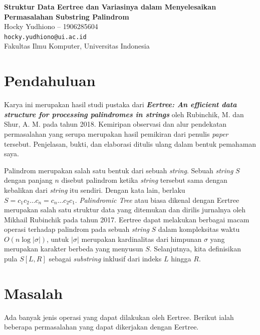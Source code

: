 \documentclass[11pt, a4paper, final]{article}
\begin{document}
\begin{center}
    \Large
    \textbf{Struktur Data Eertree dan Variasinya dalam Menyelesaikan Permasalahan Substring Palindrom\\}
    \vspace{0.2cm}
    \Large
    Hocky Yudhiono – 1906285604\\
    \texttt{hocky.yudhiono@ui.ac.id}\\
    \vspace{0.2cm}
    \large
    Fakultas Ilmu Komputer, Universitas Indonesia\\
\end{center}
\onehalfspacing

\section{Pendahuluan}

Karya ini merupakan hasil studi pustaka dari \textit{\textbf{Eertree: An efficient data structure for processing palindromes in strings}} oleh Rubinchik, M. dan Shur, A. M. pada tahun 2018. Kemiripan observasi dan alur pendekatan permasalahan yang serupa merupakan hasil pemikiran dari penulis \textit{paper} tersebut. Penjelasan, bukti, dan elaborasi ditulis ulang dalam bentuk pemahaman saya.

Palindrom merupakan salah satu bentuk dari sebuah \textit{string}. Sebuah \textit{string} $S$ dengan panjang $n$ disebut palindrom ketika \textit{string} tersebut sama dengan kebalikan dari \textit{string} itu sendiri. Dengan kata lain, berlaku $S=c_1c_2\dots c_n=c_n \dots c_2 c_1$. \textit{Palindromic Tree} atau biasa dikenal dengan Eertree merupakan salah satu struktur data yang ditemukan dan dirilis jurnalnya oleh Mikhail Rubinchik pada tahun 2017. Eertree dapat melakukan berbagai macam operasi terhadap palindrom pada sebuah \textit{string} $S$ dalam kompleksitas waktu $O(n \log |\sigma|)$, untuk $|\sigma|$ merupakan kardinalitas dari himpunan $\sigma$ yang merupakan karakter berbeda yang menyusun $S$. Selanjutnya, kita definisikan pula $S[L, R]$ sebagai \textit{substring} inklusif dari indeks $L$ hingga $R$.

\section{Masalah}

Ada banyak jenis operasi yang dapat dilakukan oleh Eertree. Berikut ialah beberapa permasalahan yang dapat dikerjakan dengan Eertree.
\end{document}
